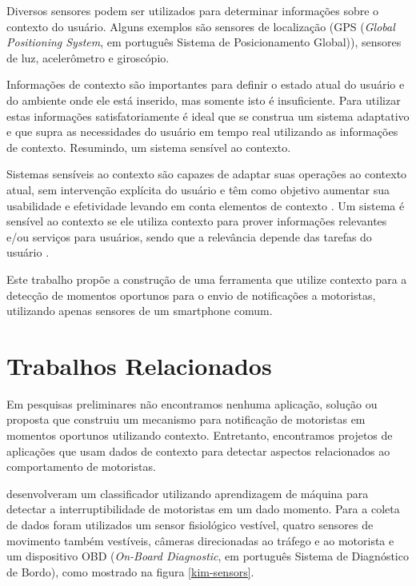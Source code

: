 Diversos sensores podem ser utilizados para determinar informações sobre o contexto do usuário. Alguns exemplos são
sensores de localização (GPS (\textit{Global Positioning System}, em português Sistema de Posicionamento Global)),
sensores de luz, acelerômetro e giroscópio.

Informações de contexto são importantes para definir o estado atual do usuário e do ambiente onde ele está inserido,
mas somente isto é insuficiente. Para utilizar estas informações satisfatoriamente é ideal que se construa um sistema
adaptativo e que supra as necessidades do usuário em tempo real utilizando as informações de contexto. Resumindo,
um sistema sensível ao contexto.

Sistemas sensíveis ao contexto são capazes de adaptar suas operações ao contexto atual, sem intervenção
explícita do usuário e têm como objetivo aumentar sua usabilidade e efetividade levando em conta elementos
de contexto \cite{baldauf2007survey}.  Um sistema é sensível ao contexto se ele utiliza contexto para prover
informações relevantes e/ou serviços para usuários, sendo que a relevância depende das tarefas do usuário
\cite{abowd1999towards}.

Este trabalho propõe a construção de uma ferramenta que utilize contexto para a detecção de momentos oportunos para
o envio de notificações a motoristas, utilizando apenas sensores de um smartphone comum.

\section{Trabalhos Relacionados}
\label{trabalhos-relacionados}

Em pesquisas preliminares não encontramos nenhuma aplicação, solução ou proposta que construiu um mecanismo para
notificação de motoristas em momentos oportunos utilizando contexto. Entretanto, encontramos projetos de aplicações que
usam dados de contexto para detectar aspectos relacionados ao comportamento de motoristas.

 desenvolveram um classificador utilizando aprendizagem de máquina para detectar a interruptibilidade
de motoristas em um dado momento. Para a coleta de dados foram utilizados um sensor fisiológico vestível, quatro sensores
de movimento também vestíveis, câmeras direcionadas ao tráfego e ao motorista e um dispositivo OBD (\textit{On-Board Diagnostic},
em português Sistema de Diagnóstico de Bordo), como mostrado na figura \ref{kim-sensors}.

